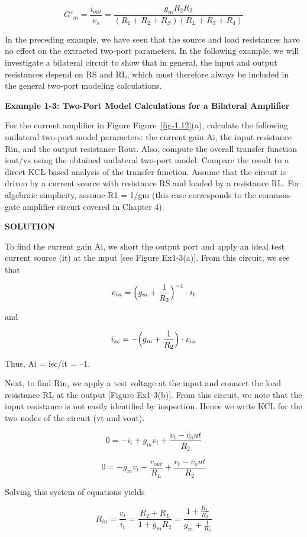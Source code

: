 \documentclass[
  11pt,
  letterpaper,
  abstract]{scrbook}
\begin{document}
\[
G'_m = \frac{i_{out}}{v_s} = \frac{g_m R_2 R_3}{(R_1 + R_2 + R_S)(R_L + R_3 + R_4)}
\]

In the preceding example, we have seen that the source and load
resistances have no effect on the extracted two-port parameters. In the
following example, we will investigate a bilateral circuit to show that
in general, the input and output resistances depend on RS and RL, which
must therefore always be included in the general two-port modeling
calculations.

\textbf{Example 1-3: Two-Port Model Calculations for a Bilateral
Amplifier}

For the current amplifier in Figure Figure~\ref{fig-1.12}(a), calculate
the following unilateral two-port model parameters: the current gain Ai,
the input resistance Rin, and the output resistance Rout. Also, compute
the overall transfer function iout/vs using the obtained unilateral
two-port model. Compare the result to a direct KCL-based analysis of the
transfer function. Assume that the circuit is driven by a current source
with resistance RS and loaded by a resistance RL. For algebraic
simplicity, assume R1 = 1/gm (this case corresponds to the common-gate
amplifier circuit covered in Chapter 4).

\textbf{SOLUTION}

To find the current gain Ai, we short the output port and apply an ideal
test current source (it) at the input {[}see Figure Ex1-3(a){]}. From
this circuit, we see that

\[
v_{in} = \Bigl( g_m + \frac{1}{R_2} \Bigr)^{-1} \cdot i_t
\]

and

\[
i_{sc} = - \Bigl( g_m + \frac{1}{R_2} \Bigr) \cdot v_{in}
\]

Thus, Ai = isc/it = --1.

Next, to find Rin, we apply a test voltage at the input and connect the
load resistance RL at the output {[}Figure Ex1-3(b){]}. From this
circuit, we note that the input resistance is not easily identified by
inspection. Hence we write KCL for the two nodes of the circuit (vt and
vout).

\[
0 = -i_t + g_m v_t + \frac{v_t - v_out}{R_2}
\]

\[
0 = - g_m v_t + \frac{v_{out}}{R_L} + \frac{v_t - v_out}{R_2}
\]

Solving this system of equations yields

\[
R_{in} = \frac{v_t}{i_t} = \frac{R_2 + R_L}{1 + g_m R_2} = \frac{1 + \frac{R_L}{R_2}}{g_m + \frac{1}{R_2}}
\]
\end{document}
